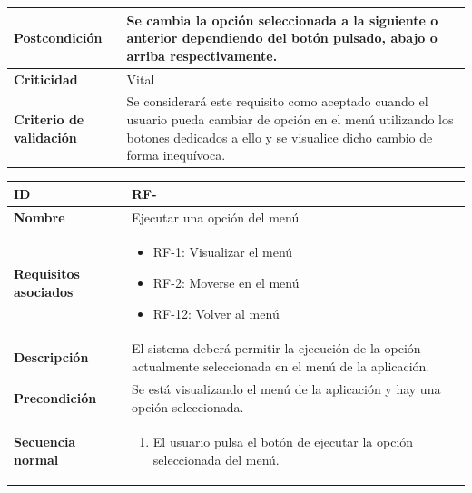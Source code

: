 \begin{center}
\begin{tabular}{ | p{4.7cm} | p{10cm} | }
		\hline
		\textbf{Postcondición} & 
		Se cambia la opción seleccionada a la siguiente o anterior dependiendo del botón pulsado, abajo o arriba respectivamente.
		\\
		
		\hline 
		\textbf{Criticidad} &
		Vital\\
		
		\hline 
		\textbf{Criterio de validación} & 
		Se considerará este requisito como aceptado cuando el usuario pueda cambiar de opción en el menú utilizando los botones dedicados a ello y se visualice dicho cambio de forma inequívoca.\\
		
		\hline
	\end{tabular}
\end{center}


\begin{center}
	\begin{tabular}{ | p{4.7cm} | p{10cm} | } 
		\hline
		
		\textbf{ID} & RF-\arabic{contador_requisitos_funcionales}
		{contador_requisitos_funcionales} \\
		
		\hline 
		\textbf{Nombre} &
		Ejecutar una opción del menú\\ 
		
		\hline
		\textbf{Requisitos asociados} & 
		\begin{itemize}
			\item RF-1: Visualizar el menú
			\item RF-2: Moverse en el menú
			\item RF-12: Volver al menú
		\end{itemize}\\
		
		\hline
		\textbf{Descripción} & 
		El sistema deberá permitir la ejecución de la opción actualmente seleccionada en el menú de la aplicación.\\
		
		\hline
		\textbf{Precondición} & 
		Se está visualizando el menú de la aplicación y hay una opción seleccionada.\\
		
		\hline
		\textbf{Secuencia normal} &
		\begin{enumerate}
			\item El usuario pulsa el botón de ejecutar la opción seleccionada del menú.
		\end{enumerate}
		\\
		

\end{tabular}
\end{center}
